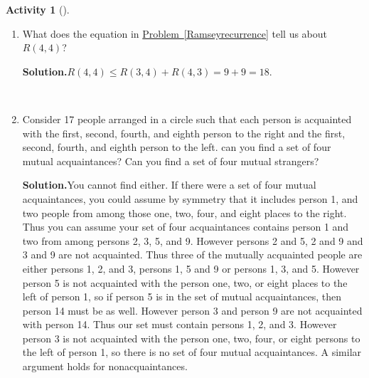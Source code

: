 \documentclass[10pt,]{book}
\theoremstyle{plain}
\theoremstyle{definition}
\newtheorem{activity}[project]{Activity}
\numberwithin{equation}{chapter}
\begin{document}
\begin{activity}[]\label{Ramseybound2}
~\par
\begin{enumerate}[label=(\alph*)]
 \item What does the equation in \hyperref[Ramseyrecurrence]{Problem~\ref{Ramseyrecurrence}} tell us about \(R(4,4)\)?%
\par\medskip\noindent%
\textbf{Solution.}\quad \(R(4,4)\le R(3,4) + R(4,3) =9+9 = 18\).%

~\par
\item Consider 17 people arranged in a circle such that each person is acquainted with the first, second, fourth, and eighth person to the right and the first, second, fourth, and eighth person to the left.  can you find a set of four mutual acquaintances?  Can you find a set of four mutual strangers?%
\par\medskip\noindent%
\textbf{Solution.}\quad You cannot find either. If there were a set of four mutual acquaintances, you could assume by symmetry that it includes person 1, and two people from among those one, two, four, and eight places to the right. Thus you can assume your set of four acquaintances contains person 1 and two from among persons 2, 3, 5, and 9. However persons 2 and 5, 2 and 9 and 3 and 9 are not acquainted. Thus three of the mutually acquainted people are either persons 1, 2, and 3, persons 1, 5 and 9 or persons 1, 3, and 5. However person 5 is not acquainted with the person one, two, or eight places to the left of person 1, so if person 5 is in the set of mutual acquaintances, then person 14 must be as well. However person 3 and person 9 are not acquainted with person 14. Thus our set must contain persons 1, 2, and 3. However person 3 is not acquainted with the person one, two, four, or eight persons to the left of person 1, so there is no set of four mutual acquaintances. A similar argument holds for nonacquaintances.%


\end{enumerate}
\end{activity}
\end{document}
